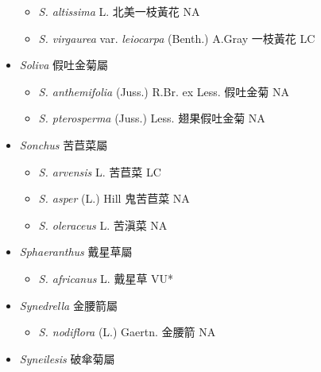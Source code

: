 \begin{itemize}
  \begin{itemize}
        \item[] \textit{S. altissima} L.  北美一枝黃花   NA
        \item[] \textit{S. virgaurea} var. \textit{leiocarpa} (Benth.) A.Gray  一枝黃花   LC
  \end{itemize}
 \item[] \textit{Soliva} 假吐金菊屬
                                
  \begin{itemize}
        \item[] \textit{S. anthemifolia} (Juss.) R.Br. ex Less.  假吐金菊   NA
        \item[] \textit{S. pterosperma} (Juss.) Less.  翅果假吐金菊   NA
  \end{itemize}
 \item[] \textit{Sonchus} 苦苣菜屬
                                
  \begin{itemize}
        \item[] \textit{S. arvensis} L.  苦苣菜   LC
        \item[] \textit{S. asper} (L.) Hill  鬼苦苣菜   NA
        \item[] \textit{S. oleraceus} L.  苦滇菜   NA
  \end{itemize}
 \item[] \textit{Sphaeranthus} 戴星草屬
                                
  \begin{itemize}
        \item[] \textit{S. africanus} L.  戴星草   VU*
  \end{itemize}
 \item[] \textit{Synedrella} 金腰箭屬
                                
  \begin{itemize}
        \item[] \textit{S. nodiflora} (L.) Gaertn.  金腰箭   NA
  \end{itemize}
 \item[] \textit{Syneilesis} 破傘菊屬
                                

\end{itemize}

